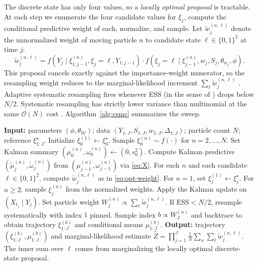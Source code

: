 The discrete state has only four values, so a \emph{locally optimal proposal} is tractable. At each step we enumerate the four candidate values for $\xi_j$, compute the conditional predictive weight of each, normalize, and sample. Let $\widetilde w^{(n,\ell)}_j$ denote the unnormalized weight of moving particle $n$ to candidate state $\ell \in \{0,1\}^2$ at time $j$:
\begin{equation}\label{eq:opt-weight}
\widetilde w^{(n,\ell)}_j = f(Y_j \mid \xi^{(n)}_{1:j-1}, \xi_j = \ell, Y_{1:j-1}) \cdot f(\xi_j = \ell \mid \xi^{(n)}_{j-1}, w_j, S_j, \theta_{w_j}, \phi).
\end{equation}
This proposal cancels exactly against the importance-weight numerator, so the resampling weight reduces to the marginal-likelihood increment $\sum_\ell \widetilde w^{(n,\ell)}_j$ \citep{doucet2000sequential}. Adaptive systematic resampling fires whenever ESS (in the sense of \citet[Ch. 3.2]{sanzalonso2025notes}) drops below $N/2$. Systematic resampling has strictly lower variance than multinomial at the same $\mathcal{O}(N)$ cost \citep{douc2005comparison}. Algorithm~\ref{alg:csmc} summarizes the sweep.

\begin{algorithm}[t]
\caption{Conditional SMC for the switching SSM}\label{alg:csmc}
\begin{algorithmic}[1]
\STATE \textbf{Input:} parameters $(\phi, \theta_{\mathcal{W}})$; data $(Y_{1:J}, S_{1:J}, w_{1:J}, \Delta_{1:J})$; particle count $N$; reference $\xi^\star_{1:J}$.
\STATE Initialize $\xi^{(1)}_0 \gets \xi^\star_0$. Sample $\xi^{(n)}_0 \sim f(\cdot)$ for $n=2,\dots,N$. Set Kalman summary $(\mu^{(n)}_0, \omega^{(n)}_0) \gets (0, s_0^2)$.
  \STATE Compute Kalman predictive $(\widetilde\mu^{(n)}_j, \widetilde\omega^{(n)}_j)$ from $(\mu^{(n)}_{j-1}, \omega^{(n)}_{j-1})$ via \eqref{eq:X}.
  \STATE For each $n$ and each candidate $\ell \in \{0,1\}^2$, compute $\widetilde w^{(n,\ell)}_j$ as in \eqref{eq:opt-weight}.
  \STATE For $n=1$, set $\xi^{(1)}_j \gets \xi^\star_j$. For $n \geq 2$, sample $\xi^{(n)}_j$ from the normalized weights. Apply the Kalman update on $(X_{t_j} \mid Y_j)$.
  \STATE Set particle weight $W^{(n)}_j \propto \sum_\ell \widetilde w^{(n,\ell)}_j$. If $\mathrm{ESS} < N/2$, resample systematically with index $1$ pinned.
\ENDFOR
\STATE Sample index $b \propto W^{(n)}_J$ and backtrace to obtain trajectory $\xi^{(b)}_{1:J}$ and conditional means $\mu^{(b)}_{1:J}$.
\STATE \textbf{Output:} trajectory $(\xi^{(b)}_{1:J}, \mu^{(b)}_{1:J})$ and marginal-likelihood estimate $\widehat Z = \prod_{j=1}^J \frac{1}{N}\sum_n \sum_\ell \widetilde w^{(n,\ell)}_j$. The inner sum over $\ell$ comes from marginalizing the locally optimal discrete-state proposal.
\end{algorithmic}
\end{algorithm}

